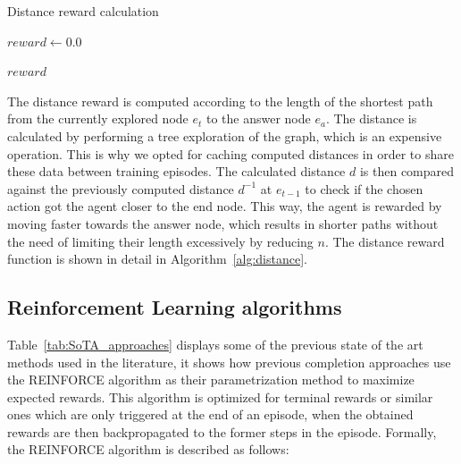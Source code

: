 \newcommand{\pluseq}{\mathrel{+}=}

\begin{algorithm}[!h]
    \caption{Distance reward calculation}
    \label{alg:distance}

    $reward \gets 0.0$


    \Return $reward$
\end{algorithm}


The distance reward is computed according to the length of the shortest path from the currently explored node $e_t$ to the answer node $e_a$. The distance is calculated by performing a tree exploration of the graph, which is an expensive operation. This is why we opted for caching computed distances in order to share these data between training episodes. The calculated distance $d$ is then compared against the previously computed distance $d^{-1}$ at $e_{t-1}$ to check if the chosen action got the agent closer to the end node. This way, the agent is rewarded by moving faster towards the answer node, which results in shorter paths without the need of limiting their length excessively by reducing $n$.
The distance reward function is shown in detail in Algorithm~\ref{alg:distance}.



\subsection{Reinforcement Learning algorithms}
\label{sec:spacerl-RLalgorithms}

Table~\ref{tab:SoTA_approaches} displays some of the previous state of the art methods used in the literature, it shows how previous completion approaches use the REINFORCE algorithm as their parametrization method to maximize expected rewards. This algorithm is optimized for terminal rewards or similar ones which are only triggered at the end of an episode, when the obtained rewards are then backpropagated to the former steps in the episode. Formally, the REINFORCE algorithm is described as follows:

